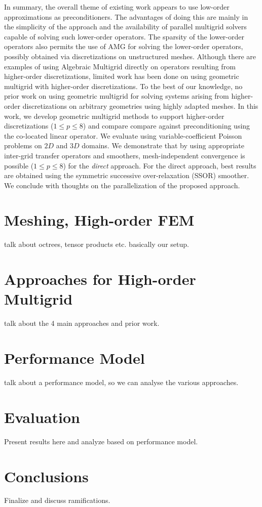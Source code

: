 \documentclass[times]{nlaauth}
\begin{document}
In summary, the overall theme of existing work appears to use
low-order approximations as preconditioners.  The advantages of doing
this are mainly in the simplicity of the approach and the availability
of parallel multigrid solvers capable of solving such lower-order
operators. The sparsity of the lower-order operators also permits the
use of AMG for solving the lower-order operators, possibly obtained
via discretizations on unstructured meshes.  Although there are
examples of using Algebraic Multigrid directly on operators resulting
from higher-order discretizations, limited work has been done on using
geometric multigrid with higher-order discretizations. To the best of
our knowledge, no prior work on using geometric multigrid for solving
systems arising from higher-order discretizations on arbitrary
geometries using highly adapted meshes.  In this work, we develop
geometric multigrid methods to support higher-order discretizations
($1\le p\le 8$) and compare compare against preconditioning using the
co-located linear operator. We evaluate using variable-coefficient
Poisson problems on $2D$ and $3D$ domains. We demonstrate that by
using appropriate inter-grid transfer operators and smoothers,
mesh-independent convergence is possible ($1\le p\le8$) for the {\em
direct} approach. For the direct approach, best results are obtained
using the symmetric successive over-relaxation (SSOR) smoother. We
conclude with thoughts on the parallelization of the proposed
approach.

\section{Meshing, High-order FEM}

talk about octrees, tensor products etc. basically our setup.

\section{Approaches for High-order Multigrid}

talk about the 4 main approaches and prior work.

\section{Performance Model}

talk about a performance model, so we can analyse the various approaches.

\section{Evaluation}

Present results here and analyze based on performance model.



\section{Conclusions}

Finalize and discuss ramifications.




\end{document}

